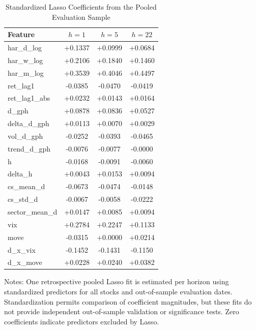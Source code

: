 
\begin{table}[htbp]
\centering
\caption{Standardized Lasso Coefficients from the Pooled Evaluation Sample}
\label{tab:importance}
\small
\begin{tabular}{lccc}
\toprule
Feature & $h=1$ & $h=5$ & $h=22$ \\
\midrule
har\_d\_log & +0.1337 & +0.0999 & +0.0684 \\
har\_w\_log & +0.2106 & +0.1840 & +0.1460 \\
har\_m\_log & +0.3539 & +0.4046 & +0.4497 \\
ret\_lag1 & -0.0385 & -0.0470 & -0.0419 \\
ret\_lag1\_abs & +0.0232 & +0.0143 & +0.0164 \\
d\_gph & +0.0878 & +0.0836 & +0.0527 \\
delta\_d\_gph & +0.0113 & +0.0070 & +0.0029 \\
vol\_d\_gph & -0.0252 & -0.0393 & -0.0465 \\
trend\_d\_gph & -0.0076 & -0.0077 & -0.0000 \\
h & -0.0168 & -0.0091 & -0.0060 \\
delta\_h & +0.0043 & +0.0153 & +0.0094 \\
cs\_mean\_d & -0.0673 & -0.0474 & -0.0148 \\
cs\_std\_d & -0.0067 & -0.0058 & -0.0222 \\
sector\_mean\_d & +0.0147 & +0.0085 & +0.0094 \\
vix & +0.2784 & +0.2247 & +0.1133 \\
move & -0.0315 & +0.0000 & +0.0214 \\
d\_x\_vix & -0.1452 & -0.1431 & -0.1150 \\
d\_x\_move & +0.0228 & +0.0240 & +0.0382 \\
\bottomrule
\end{tabular}
\begin{tablenotes}\small
\item Notes: One retrospective pooled Lasso fit is estimated per horizon
using standardized predictors for all stocks and out-of-sample evaluation
dates. Standardization permits comparison of coefficient magnitudes, but
these fits do not provide independent out-of-sample validation or
significance tests. Zero coefficients indicate predictors excluded by
Lasso.
\end{tablenotes}
\end{table}
